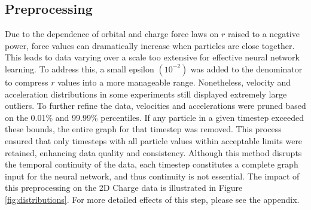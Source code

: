 \documentclass[11pt]{article}
\begin{document}
\subsection{Preprocessing}
Due to the dependence of orbital and charge force laws on \(r\) raised to a negative power, force values can dramatically increase when particles are close together. This leads to data varying over a scale too extensive for effective neural network learning. To address this, a small epsilon \((10^{-2})\) was added to the denominator to compress \(r\) values into a more manageable range. Nonetheless, velocity and acceleration distributions in some experiments still displayed extremely large outliers. To further refine the data, velocities and accelerations were pruned based on the 0.01\% and 99.99\% percentiles. If any particle in a given timestep exceeded these bounds, the entire graph for that timestep was removed. This process ensured that only timesteps with all particle values within acceptable limits were retained, enhancing data quality and consistency. Although this method disrupts the temporal continuity of the data, each timestep constitutes a complete graph input for the neural network, and thus continuity is not essential. The impact of this preprocessing on the 2D Charge data is illustrated in Figure \ref{fig:distributions}. For more detailed effects of this step, please see the appendix.
\end{document}
